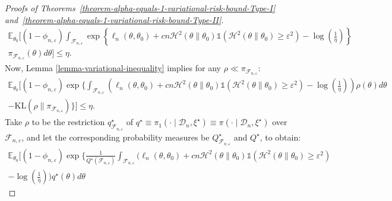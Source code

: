 \documentclass[12pt]{article}
\numberwithin{equation}{section}
\begin{document}
\begin{proof}[Proofs of Theorems~\ref{theorem-alpha-equals-1-variational-risk-bound-Type-I} and~\ref{theorem-alpha-equals-1-variational-risk-bound-Type-II}]
\begin{multline}\label{eq:hell-risk-lemma-4}
        \mathbb{E}_{\theta_0}\Bigg[
            (1-\phi_{n,\varepsilon})
            \int_{\mathcal{F}_{n,\varepsilon}}
            \exp\left\{
                \ell_{n}(\theta,\theta_0)
                + c n \mathcal{H}^{2}(\theta\parallel\theta_0)
                  \mathds{1}\!\left(\mathcal{H}^{2}(\theta\parallel\theta_0)\ge \varepsilon^2\right)
                - \log\left(\frac{1}{\eta}\right)
            \right\}\\ 
            \pi_{\mathcal{F}_{n,\varepsilon}}(\theta)d\theta
        \Bigg]
        \le \eta.
\end{multline}
Now, Lemma \ref{lemma-variational-inequality} implies for any $\rho \ll \pi_{\mathcal{F}_{n, \varepsilon}}$:
\begin{multline}\label{eq:hell-risk-lemma-5}
    \mathbb{E}_{\theta_0}\Bigg[(1-\phi_{n, \varepsilon}) \exp\Bigg\{\int_{\mathcal{F}_{n, \varepsilon}}\left(\ell_n(\theta, \theta_0) + c n \mathcal{H}^{2}(\theta\parallel \theta_0)\mathds{1}(\mathcal{H}^{2}(\theta\parallel \theta_0) \geq \varepsilon^2) - \log\left(\frac{1}{\eta}\right)\right)\rho(\theta)d\theta\\
    -\mathrm{KL}(\rho\parallel \pi_{\mathcal{F}_{n, \varepsilon}})\Bigg\}\Bigg] \leq \eta.
\end{multline}
Take $\rho$ to be the restriction $q^{\star}_{\mathcal{F}_{n, \varepsilon}}$ of $q^{\star}\equiv \pi_1(\cdot\mid \mathcal{D}_n, \xi^{\star})\equiv \pi(\cdot\mid \mathcal{D}_n, \xi^{\star})$ over $\mathcal{F}_{n, \varepsilon}$, and let the corresponding probability measures be $Q^{\star}_{\mathcal{F}_{n, \varepsilon}}$ and $Q^{\star}$, to obtain:
\begin{multline}\label{eq:hell-risk-lemma-6}
    \mathbb{E}_{\theta_0}\Bigg[(1-\phi_{n, \varepsilon}) \exp\Bigg\{\frac{1}{Q^{\star}(\mathcal{F}_{n, \varepsilon})}\int_{\mathcal{F}_{n, \varepsilon}}\Bigg(\ell_n(\theta, \theta_0) + c n \mathcal{H}^{2}(\theta\parallel \theta_0)\mathds{1}(\mathcal{H}^{2}(\theta\parallel \theta_0) \geq \varepsilon^2)\\ - \log\left(\frac{1}{\eta}\right)\Bigg)q^{\star}(\theta)d\theta

\end{multline}
\end{proof}
\end{document}
